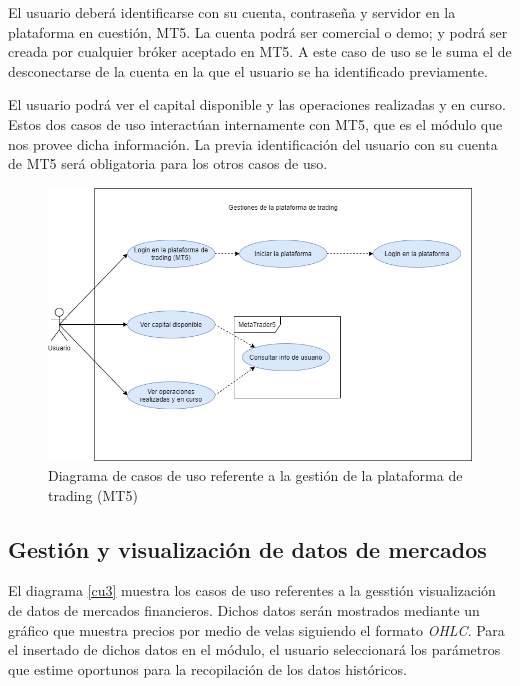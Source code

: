 El usuario deberá identificarse con su cuenta, contraseña y servidor en la plataforma en cuestión, MT5. La cuenta podrá ser comercial o demo; y podrá ser creada por cualquier bróker aceptado en MT5. A este caso de uso se le suma el de desconectarse de la cuenta en la que el usuario se ha identificado previamente. \newline

El usuario podrá ver el capital disponible y las operaciones realizadas y en curso. Estos dos casos de uso interactúan internamente con MT5, que es el módulo que nos provee dicha información. La previa identificación del usuario con su cuenta de MT5 será obligatoria para los otros casos de uso.


\begin{figure}[h] 
	\includegraphics[width=1\textwidth]{imagenes/diagramas_casos_de_uso/CU2-gestiones_MT5.png} 
	\caption{Diagrama de casos de uso referente a la gestión de la plataforma de trading (MT5)}  \label{cu2}
\end{figure}

\subsection{Gestión y visualización de datos de mercados}

El diagrama \ref{cu3} muestra los casos de uso referentes a la gesstión visualización de datos de mercados financieros. Dichos datos serán mostrados mediante un gráfico que muestra precios por medio de velas siguiendo el formato \textit{OHLC}. Para el insertado de dichos datos en el módulo, el usuario seleccionará los parámetros que estime oportunos para la recopilación de los datos históricos. \newline

